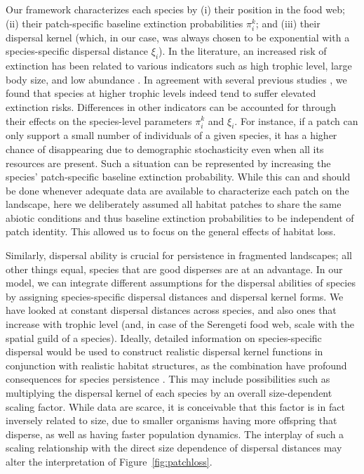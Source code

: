 \documentclass[11pt]{article}
\begin{document}
Our framework characterizes each species by (i) their position in the food web; (ii) their patch-specific baseline extinction probabilities $\pi_i^k$; and (iii) their dispersal kernel (which, in our case, was always chosen to be exponential with a species-specific dispersal distance $\xi_i$). In the literature, an increased risk of extinction has been related to various indicators such as high trophic level, large body size, and low abundance \citep{GastonBlackburn1995, Purvisetal2000, Cardillo2005, Davidson2009, LeeJetz2011}. In agreement with several previous studies \citep{Kondoh2003, vanNouhuys2005, EklofEbenman2006, Curtsdotter2011, Liao2017RSPB, Ryser2019}, we found that species at higher trophic levels indeed tend to suffer elevated extinction risks. Differences in other indicators can be accounted for through their effects on the species-level parameters $\pi_i^k$ and $\xi_i$. For instance, if a patch can only support a small number of individuals of a given species, it has a higher chance of disappearing due to demographic stochasticity even when all its resources are present. Such a situation can be represented by increasing the species' patch-specific baseline extinction probability. While this can and should be done whenever adequate data are available to characterize each patch on the landscape, here we deliberately assumed all habitat patches to share the same abiotic conditions \citep{Leibold2004} and thus baseline extinction probabilities to be independent of patch identity. This allowed us to focus on the general effects of habitat loss.

Similarly, dispersal ability is crucial for persistence in fragmented landscapes; all other things equal, species that are good disperses are at an advantage. In our model, we can integrate different assumptions for the dispersal abilities of species by assigning species-specific dispersal distances and dispersal kernel forms. We have looked at constant dispersal distances across species, and also ones that increase with trophic level (and, in case of the Serengeti food web, scale with the spatial guild of a species). Ideally, detailed information on species-specific dispersal would be used to construct realistic dispersal kernel functions in conjunction with realistic habitat structures, as the combination have profound consequences for species persistence \citep{Arevalletal2018}. This may include possibilities such as multiplying the dispersal kernel of each species by an overall size-dependent scaling factor. While data are scarce, it is conceivable that this factor is in fact inversely related to size, due to smaller organisms having more offspring that disperse, as well as having faster population dynamics. The interplay of such a scaling relationship with the direct size dependence of dispersal distances may alter the interpretation of Figure~\ref{fig:patchloss}.
\end{document}
